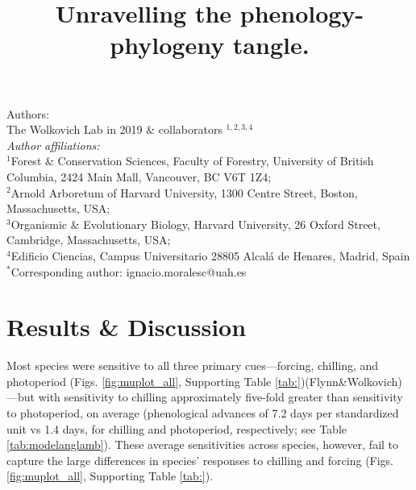 \documentclass{article}\usepackage[]{graphicx}\usepackage[]{color}
\title{Unravelling the phenology-phylogeny tangle.}
\begin{document}
\maketitle

\noindent Authors:\\
The Wolkovich Lab in 2019 \& collaborators $^{1,2,3,4}$ %
\vspace{2ex}\\
\emph{Author affiliations:}\\
$^{1}$Forest \& Conservation Sciences, Faculty of Forestry, University of British Columbia, 2424 Main Mall, Vancouver, BC V6T 1Z4;\\
$^{2}$Arnold Arboretum of Harvard University, 1300 Centre Street, Boston, Massachusetts, USA;\\
$^{3}$Organismic \& Evolutionary Biology, Harvard University, 26 Oxford Street, Cambridge, Massachusetts, USA;\\
$^{4}$Edificio Ciencias, Campus Universitario 28805 Alcalá de Henares, Madrid, Spain\\
 

\vspace{2ex}
$^*$Corresponding author: ignacio.moralesc@uah.es\\
\renewcommand{\thetable}{\arabic{table}}
\renewcommand{\thefigure}{\arabic{figure}}
\renewcommand{\labelitemi}{$-$}

\clearpage







\section*{Results \& Discussion}

Most species were sensitive to all three primary cues---forcing, chilling, and photoperiod (Figs. \ref{fig:muplot_all}, Supporting Table \ref{tab:})\citep[see also][]{Laube:2014aettinger2020}(Flynn&Wolkovich)---but with sensitivity to chilling approximately five-fold greater than sensitivity to photoperiod, on average (phenological advances of 7.2 days per standardized unit vs 1.4 days, for chilling and photoperiod, respectively; see Table \ref{tab:modelanglamb}). These average sensitivities across species, however, fail to capture the large differences in species' responses to chilling and forcing (Figs. \ref{fig:muplot_all}, Supporting Table \ref{tab:}). 
\end{document}
